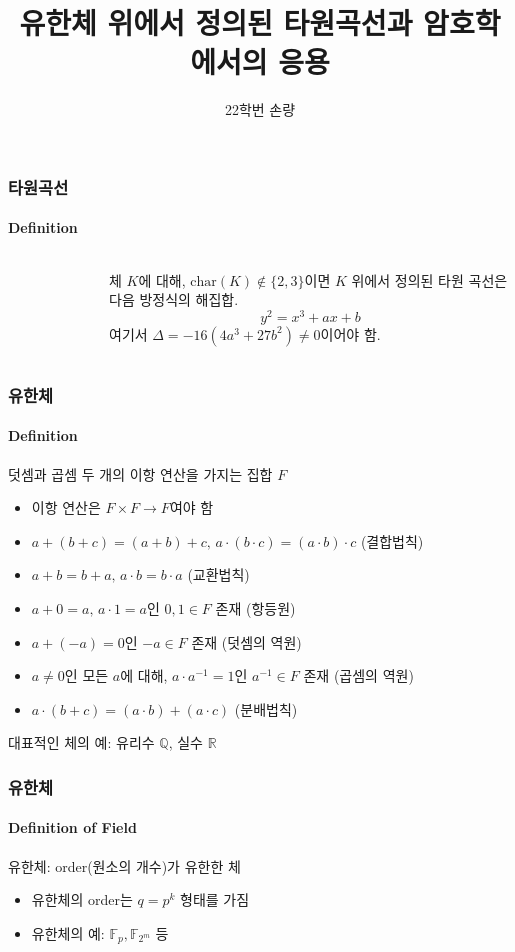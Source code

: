\documentclass[aspectratio=169,mathserif]{beamer}
\title{유한체 위에서 정의된 타원곡선과 암호학에서의 응용}
\author[Sohn]{22학번 손량}
\newcommand{\Fp}{\mathbb{F}_p}
\newcommand{\Ftwom}{\mathbb{F}_{2^m}}
\begin{document}
  \begin{frame}
    \titlepage
  \end{frame}

  \begin{frame}
    \frametitle{타원곡선}
    \framesubtitle{Definition}

    \begin{columns}
      \begin{figure}
        \centering
        \scalebox{0.5}{}
      \end{figure}
      체 \(K\)에 대해, \(\mathrm{char}(K)\not\in\{2,3\}\)이면 \(K\) 위에서 정의된 타원 곡선은 다음 방정식의 해집합.
      \[y^2 = x^3 + ax + b\]
      여기서 \(\Delta = -16(4a^3 + 27b^2) \not= 0\)이어야 함.
    \end{columns}
  \end{frame}

  \begin{frame}
    \frametitle{유한체}
    \framesubtitle{Definition}
    덧셈과 곱셈 두 개의 이항 연산을 가지는 집합 \(F\)
    \pause
    \begin{itemize}
      \item 이항 연산은 \(F\times F\to F\)여야 함
      \pause
      \item \(a+(b+c)=(a+b)+c,\,a\cdot(b\cdot c)=(a\cdot b)\cdot c\) (결합법칙)
      \item \(a+b=b+a,\,a\cdot b=b\cdot a\) (교환법칙)
      \item \(a+0=a,\,a\cdot 1=a\)인 \(0, 1\in F\) 존재 (항등원)
      \item \(a+(-a)=0\)인 \(-a\in F\) 존재 (덧셈의 역원)
      \item \(a\not=0\)인 모든 \(a\)에 대해, \(a\cdot a^{-1}=1\)인 \(a^{-1}\in F\) 존재 (곱셈의 역원)
      \item \(a\cdot(b+c)=(a\cdot b)+(a\cdot c)\) (분배법칙)
    \end{itemize}
    \pause
    대표적인 체의 예: 유리수 \(\mathbb{Q}\), 실수 \(\mathbb{R}\)
  \end{frame}

  \begin{frame}
    \frametitle{유한체}
    \framesubtitle{Definition of Field}

    유한체: order(원소의 개수)가 유한한 체
    \begin{itemize}
      \item 유한체의 order는 \(q=p^k\) 형태를 가짐
      \item 유한체의 예: \(\Fp, \Ftwom\) 등
    \end{itemize}
  \end{frame}
\end{document}
